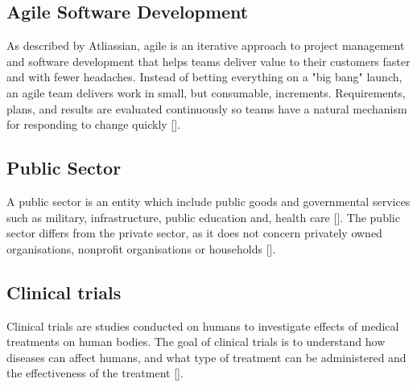 \subsection{Agile Software Development}
As described by Atliassian, agile is an iterative approach to project management and software development that helps teams deliver value to their customers faster and with fewer headaches. Instead of betting everything on a "big bang" launch, an agile team delivers work in small, but consumable, increments. Requirements, plans, and results are evaluated continuously so teams have a natural mechanism for responding to change quickly [\cite{a_2022}]. 

\subsection{Public Sector}
A public sector is an entity which include public goods and governmental services such as military, infrastructure, public education and, health care [\cite{ps_2022}]. The public sector differs from the private sector, as it does not concern privately owned organisations, nonprofit organisations or households [\cite{os_2022}]. 

\subsection{Clinical trials}
Clinical trials are studies conducted on humans to investigate effects of medical treatments on human bodies. The goal of clinical trials is to understand how diseases can affect humans, and what type of treatment can be administered and the effectiveness of the treatment [\cite{hn_2020}].